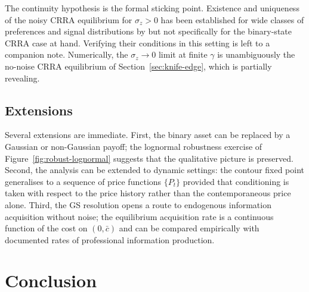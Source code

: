 \documentclass[12pt,letterpaper]{article}
\theoremstyle{definition}
\theoremstyle{remark}
\newcommand{\1}{\mathbf{1}}
\begin{document}
The continuity hypothesis is the formal sticking point. Existence
and uniqueness of the noisy CRRA equilibrium for $\sigma_{z}>0$ has been
established for wide classes of preferences and signal distributions by
\citet{BreonDrish2015} but not specifically for the binary-state CRRA
case at hand. Verifying their conditions in this setting is left to a
companion note. Numerically, the $\sigma_{z}\to 0$ limit at finite
$\gamma$ is unambiguously the no-noise CRRA equilibrium of
Section~\ref{sec:knife-edge}, which is partially revealing.


\subsection{Extensions}

Several extensions are immediate. First, the binary asset can be replaced
by a Gaussian or non-Gaussian payoff; the lognormal robustness exercise of
Figure~\ref{fig:robust-lognormal} suggests that the qualitative picture is
preserved. Second, the analysis can be extended to dynamic settings: the
contour fixed point generalises to a sequence of price functions
$\{P_{t}\}$ provided that conditioning is taken with respect to the price
history rather than the contemporaneous price alone. Third, the GS
resolution opens a route to endogenous information acquisition without
noise; the equilibrium acquisition rate is a continuous function of the
cost on $(0,\bar c)$ and can be compared empirically with documented rates
of professional information production.

\section{Conclusion}\label{sec:conclusion}
\end{document}
